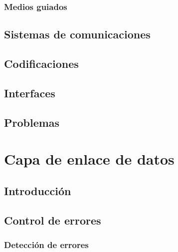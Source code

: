 \documentclass[
]{book}
\begin{document}
\hypertarget{medios-guiados}{%
\subsection{Medios guiados}\label{medios-guiados}}

\hypertarget{sistemas-de-comunicaciones-1}{%
\section{Sistemas de comunicaciones}\label{sistemas-de-comunicaciones-1}}

\hypertarget{codificaciones}{%
\section{Codificaciones}\label{codificaciones}}

\hypertarget{interfaces}{%
\section{Interfaces}\label{interfaces}}

\hypertarget{problemas-1}{%
\section{Problemas}\label{problemas-1}}

\hypertarget{capa-de-enlace-de-datos}{%
\chapter{Capa de enlace de datos}\label{capa-de-enlace-de-datos}}

\hypertarget{introducciuxf3n-1}{%
\section{Introducción}\label{introducciuxf3n-1}}

\hypertarget{control-de-errores}{%
\section{Control de errores}\label{control-de-errores}}

\hypertarget{detecciuxf3n-de-errores}{%
\subsection{Detección de errores}\label{detecciuxf3n-de-errores}}
\end{document}

